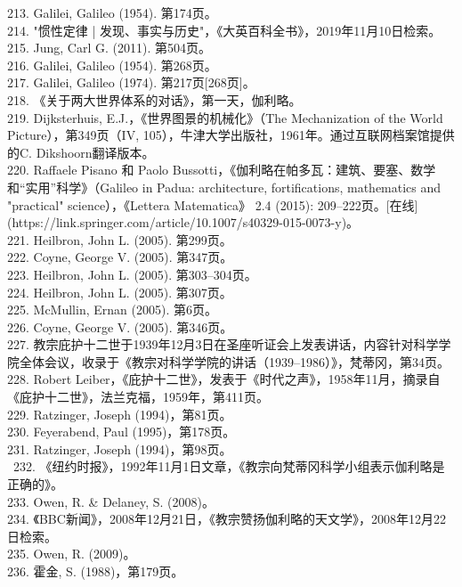 213. Galilei, Galileo (1954). 第174页。\\
214. "惯性定律 | 发现、事实与历史"，《大英百科全书》，2019年11月10日检索。\\
215. Jung, Carl G. (2011). 第504页。\\
216. Galilei, Galileo (1954). 第268页。\\
217. Galilei, Galileo (1974). 第217页[268页]。\\
218. 《关于两大世界体系的对话》，第一天，伽利略。\\
219. Dijksterhuis, E.J.，《世界图景的机械化》（The Mechanization of the World Picture），第349页（IV, 105），牛津大学出版社，1961年。通过互联网档案馆提供的C. Dikshoorn翻译版本。\\
220. Raffaele Pisano 和 Paolo Bussotti，《伽利略在帕多瓦：建筑、要塞、数学和“实用”科学》（Galileo in Padua: architecture, fortifications, mathematics and "practical" science），《Lettera Matematica》 2.4 (2015): 209–222页。[在线](https://link.springer.com/article/10.1007/s40329-015-0073-y)。\\
221. Heilbron, John L. (2005). 第299页。\\
222. Coyne, George V. (2005). 第347页。\\
223. Heilbron, John L. (2005). 第303–304页。\\
224. Heilbron, John L. (2005). 第307页。\\
225. McMullin, Ernan (2005). 第6页。\\
226. Coyne, George V. (2005). 第346页。\\
227. 教宗庇护十二世于1939年12月3日在圣座听证会上发表讲话，内容针对科学学院全体会议，收录于《教宗对科学学院的讲话（1939–1986）》，梵蒂冈，第34页。\\
228. Robert Leiber，《庇护十二世》，发表于《时代之声》，1958年11月，摘录自《庇护十二世》，法兰克福，1959年，第411页。\\
229. Ratzinger, Joseph (1994)，第81页。\\
230. Feyerabend, Paul (1995)，第178页。\\
231. Ratzinger, Joseph (1994)，第98页。\\\
232. 《纽约时报》，1992年11月1日文章，《教宗向梵蒂冈科学小组表示伽利略是正确的》。\\
233. Owen, R. & Delaney, S. (2008)。\\
234. 《BBC新闻》，2008年12月21日，《教宗赞扬伽利略的天文学》，2008年12月22日检索。\\
235. Owen, R. (2009)。\\
236. 霍金, S. (1988)，第179页。\\
